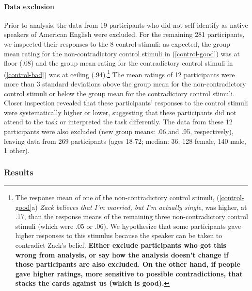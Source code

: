 \documentclass[11pt,fleqn]{article}
\newcommand{\6}{\mbox{$[\hspace*{-.6mm}[$}}
\newcommand{\9}{\mbox{$]\hspace*{-.6mm}]$}}
\begin{document}
{\paragraph{Data exclusion}
Prior to analysis, the data from 19 participants who did not self-identify as native speakers of American English were excluded. For the remaining 281 participants, we inspected their responses to the 8 control stimuli: as expected, the group mean rating for the non-contradictory control stimuli in (\ref{control-good}) was at floor (.08) and the group mean rating for the contradictory control stimuli in (\ref{control-bad}) was at ceiling (.94).\footnote{The response mean of one of the non-contradictory control stimuli, (\ref{control-good}a) {\em Zack believes that I'm married, but I'm actually single}, was higher, at .17, than the response means of the remaining three non-contradictory control stimuli (which were .05 or .06). We hypothesize that some participants gave higher responses to this stimulus because the speaker can be taken to contradict Zack's belief. {\bf Either exclude participants who got this wrong from analysis, or say how the analysis doesn't change if those participants are also excluded. On the other hand, if people gave higher ratings, more sensitive to possible contradictions, that stacks the cards against us (which is good).}}  The mean ratings of 12 participants were more than 3 standard deviations above the group mean for the non-contradictory control stimuli or below the group mean for the contradictory control stimuli. Closer inspection revealed that these participants' responses to the control stimuli were systematically higher or lower, suggesting that these participants did not attend to the task or interpreted the task differently. The data from these 12 participants were also excluded (new group means: .06 and .95, respectively), leaving data from 269 participants (ages 18-72; median: 36; 128 female, 140 male, 1 other).  

\subsubsection{Results}

}
\end{document}
